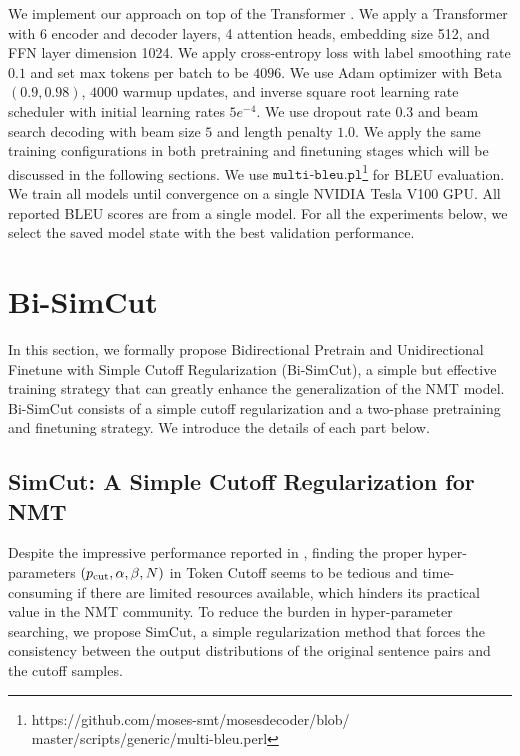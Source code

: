 \documentclass[11pt]{article}
\begin{document}
We implement our approach on top of the Transformer \cite{vaswani2017attention}. We apply a Transformer with 6 encoder and decoder layers, 4 attention heads, embedding size 512, and FFN layer dimension 1024. We apply cross-entropy loss with label smoothing rate $0.1$ and set max tokens per batch to be $4096$. 
We use Adam optimizer with Beta $(0.9, 0.98)$, $4000$ warmup updates, and inverse square root learning rate scheduler with initial learning rates $5e^{-4}$. We use dropout rate $0.3$ and beam search decoding with beam size $5$ and length penalty $1.0$. We apply the same training configurations in both pretraining and finetuning stages which will be discussed in the following sections. We use $\texttt{multi-bleu.pl}$\footnote{https://github.com/moses-smt/mosesdecoder/blob/ master/scripts/generic/multi-bleu.perl} for BLEU \cite{papineni2002bleu} evaluation. We train all models until convergence on a single NVIDIA Tesla V100 GPU. All reported BLEU scores are from a single model. For all the experiments below, we select the saved model state with the best validation performance.


\section{Bi-SimCut}

In this section, we formally propose Bidirectional Pretrain and Unidirectional Finetune with Simple Cutoff Regularization (Bi-SimCut), a simple but effective training strategy that can greatly enhance the generalization of the NMT model. Bi-SimCut consists of a simple cutoff regularization and a two-phase pretraining and finetuning strategy. We introduce the details of each part below.

\subsection{SimCut: A Simple Cutoff Regularization for NMT}

Despite the impressive performance reported in \citet{shen2020simple}, finding the proper hyper-parameters $(p_{\rm cut}, \alpha, \beta, N)$ in Token Cutoff seems to be tedious and time-consuming if there are limited resources available, which hinders its practical value in the NMT community. To reduce the burden in hyper-parameter searching, we propose SimCut, a simple regularization method that forces the consistency between the output distributions of the original sentence pairs and the cutoff samples. 
\end{document}
